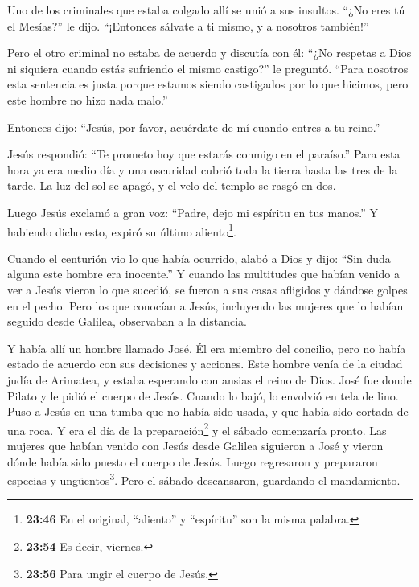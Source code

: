  Uno de los criminales que estaba colgado allí se unió a
sus insultos. ``¿No eres tú el Mesías?'' le dijo. ``¡Entonces sálvate a
ti mismo, y a nosotros también!''

 Pero el otro criminal no estaba de acuerdo y discutía con
él: ``¿No respetas a Dios ni siquiera cuando estás sufriendo el mismo
castigo?'' le preguntó.  ``Para nosotros esta sentencia es
justa porque estamos siendo castigados por lo que hicimos, pero este
hombre no hizo nada malo.''

 Entonces dijo: ``Jesús, por favor, acuérdate de mí cuando
entres a tu reino.''

 Jesús respondió: ``Te prometo hoy que estarás conmigo en
el paraíso.''  Para esta hora ya era medio día y una
oscuridad cubrió toda la tierra hasta las tres de la tarde.
 La luz del sol se apagó, y el velo del templo se rasgó en
dos.

 Luego Jesús exclamó a gran voz: ``Padre, dejo mi espíritu
en tus manos.'' Y habiendo dicho esto, expiró su último
aliento\footnote{\textbf{23:46} En el original, ``aliento'' y
  ``espíritu'' son la misma palabra.}.

 Cuando el centurión vio lo que había ocurrido, alabó a
Dios y dijo: ``Sin duda alguna este hombre era inocente.'' 
Y cuando las multitudes que habían venido a ver a Jesús vieron lo que
sucedió, se fueron a sus casas afligidos y dándose golpes en el pecho.
 Pero los que conocían a Jesús, incluyendo las mujeres que
lo habían seguido desde Galilea, observaban a la distancia.

 Y había allí un hombre llamado José. Él era miembro del
concilio,  pero no había estado de acuerdo con sus
decisiones y acciones. Este hombre venía de la ciudad judía de Arimatea,
y estaba esperando con ansias el reino de Dios.  José fue
donde Pilato y le pidió el cuerpo de Jesús.  Cuando lo
bajó, lo envolvió en tela de lino. Puso a Jesús en una tumba que no
había sido usada, y que había sido cortada de una roca.  Y
era el día de la preparación\footnote{\textbf{23:54} Es decir, viernes.}
y el sábado comenzaría pronto.  Las mujeres que habían
venido con Jesús desde Galilea siguieron a José y vieron dónde había
sido puesto el cuerpo de Jesús.  Luego regresaron y
prepararon especias y ungüentos\footnote{\textbf{23:56} Para ungir el
  cuerpo de Jesús.}. Pero el sábado descansaron, guardando el
mandamiento.

